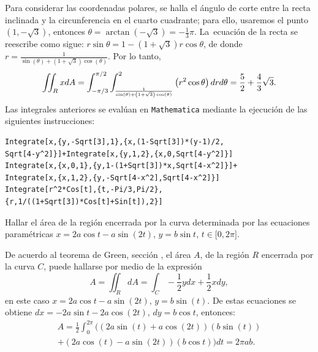 Para considerar las coordenadas polares, se halla el ángulo de corte entre la recta inclinada y la circunferencia en el cuarto cuadrante; para ello, usaremos el punto
$(1,-\sqrt{3})$, entonces $\theta=\arctan \left(-\sqrt{3}\right)= -\frac{1}{3}\pi$. La~ecuación de la recta se reescribe como sigue:
$ r\sin \theta =1-\left( 1+\sqrt{3}\right)  r\cos \theta $,
de donde $r=\frac{1}{\sin(\theta)+\left(1+\sqrt{3}\right)\cos(\theta)}$.
Por lo tanto,
\[\displaystyle \iint _R x dA=\int_{-\pi/3}^{\pi /2}\int_{\frac{1}{\sin(\theta)+\left( 1+\sqrt{3}\right) \cos (\theta) }}^{2}\left( r^{2}\cos \theta \right) drd\theta =\frac{5}{2}+\frac{4}{3}\sqrt{3}.\]
Las integrales anteriores se evalúan en \verb"Mathematica" mediante la ejecución de las siguientes instrucciones:

\begin{tcolorbox}[title=\bf Instrucción en \verb"Mathematica"]\begin{Verbatim}[formatcom=\letraverbatim]
Integrate[x,{y,-Sqrt[3],1},{x,(1-Sqrt[3])*(y-1)/2,
Sqrt[4-y^2]}]+Integrate[x,{y,1,2},{x,0,Sqrt[4-y^2]}]
Integrate[x,{x,0,1},{y,1-(1+Sqrt[3])*x,Sqrt[4-x^2]}]+
Integrate[x,{x,1,2},{y,-Sqrt[4-x^2],Sqrt[4-x^2]}]
Integrate[r^2*Cos[t],{t,-Pi/3,Pi/2},
{r,1/((1+Sqrt[3])*Cos[t]+Sin[t]),2}]
\end{Verbatim}
\end{tcolorbox}

\begin{parrafonumerado}[resume=ordenint]
\item
Hallar el área de la región encerrada por la curva determinada por las ecuaciones paramétricas $x=2a\cos t-a\sin (2t)$, $y=b\sin t$, $t\in \lbrack 0,2\pi ]$.
\end{parrafonumerado}

\enlargethispage*{\baselineskip}

De acuerdo al teorema de Green, sección , el área $A$, de la región $R$ encerrada por la curva $C$, puede hallarse por medio de la expresión
\[A=\iint_{R}dA=\int_{C}-\frac{1}{2}ydx+\frac{1}{2}xdy,\]
en este caso $x=2a\cos t-a\sin (2t)$, $y=b\sin (t)$. De estas ecuaciones se obtiene
$dx= -2a\sin t-2a\cos (2t)$, $dy= b\cos t$,
entonces:
\begin{multline*}
A=\frac{1}{2}\int_{0}^{2\pi}\big((2a\sin(t)+a\cos(2t))(b\sin(t))\\ +(2a\cos(t)-a\sin(2t))(b\cos t) \big) dt  = 2\pi ab.
\end{multline*}

